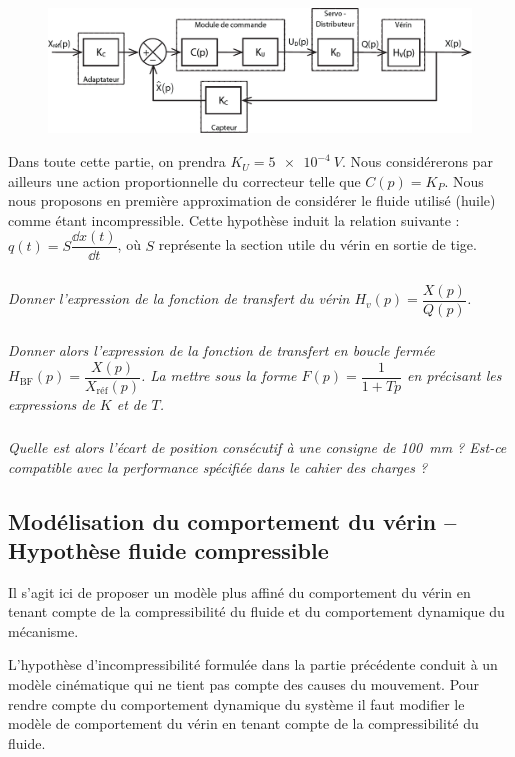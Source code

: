 \documentclass[10pt,fleqn]{article} %
\begin{document}
\begin{figure}[H]
\centering
\includegraphics[width=\linewidth]{img_07}
\end{figure}


Dans toute cette partie, on prendra  $K_U = \SI{5e-4}{V}$.
Nous considérerons par ailleurs une action proportionnelle du correcteur telle que  $C(p)=K_P$.
Nous nous proposons en première approximation de considérer le fluide utilisé (huile) comme étant incompressible. Cette hypothèse induit la relation suivante : $q(t)=S\dfrac{\dd x(t)}{\dd t}$,  où $S$ représente la section utile du vérin en sortie de tige.


\subparagraph{}\textit{Donner l'expression de la fonction de transfert du vérin  $H_v(p)=\dfrac{X(p)}{Q(p)}$. }

\subparagraph{}\textit{Donner alors l'expression de la fonction de transfert en boucle fermée $H_{\text{BF}}(p)=\dfrac{X(p)}{X_{\text{réf}}(p)}$. La mettre sous la forme $F(p)=\dfrac{1}{1+Tp}$  en précisant les expressions de $K$ et de $T$.}

\subparagraph{}\textit{Quelle est alors l'écart de position consécutif à une consigne de \SI{100}{mm} ? Est-ce compatible avec la performance spécifiée dans le cahier des charges ?}

\subsection{Modélisation du comportement du vérin -- Hypothèse fluide compressible}

\begin{obj}
Il s'agit ici de proposer un modèle plus affiné du comportement du vérin en tenant compte de la compressibilité du fluide et du comportement dynamique du mécanisme.
\end{obj}

L'hypothèse d'incompressibilité formulée dans la partie précédente conduit à un modèle cinématique qui ne tient pas compte des causes du mouvement. Pour rendre compte du comportement dynamique du système il faut modifier le modèle de comportement du vérin en tenant compte de la compressibilité du fluide.
\end{document}

